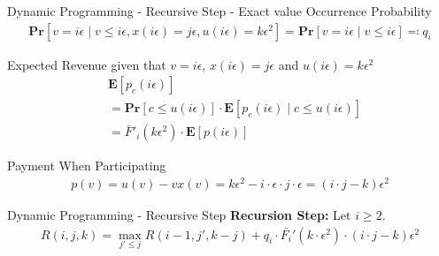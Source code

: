 \documentclass{beamer}
\begin{document}
\begin{frame}{Dynamic Programming - Recursive Step - Exact value}
  Occurrence Probability
  \begin{align*}
    \mathbf{Pr}[v = i\epsilon \mid v \leq i \epsilon, x(i\epsilon) = j\epsilon, u(i\epsilon) = k\epsilon^2] = \mathbf{Pr}[v = i\epsilon \mid v \leq i \epsilon] \eqcolon q_i
  \end{align*}

  Expected Revenue given that $v = i \epsilon$, $x(i\epsilon) = j\epsilon$ and $u(i\epsilon)=k\epsilon^2$
  \begin{align*}
     & \mathbf{E}\left[p_c(i \epsilon)\right]                                                                    \\
     & = \mathbf{Pr}[c \leq u(i \epsilon)] \cdot \mathbf{E}\left[p_c(i\epsilon) \mid c \leq u(i\epsilon) \right] \\
     & = \bar{F}'_i(k \epsilon^2) \cdot \mathbf{E}\left[p(i \epsilon)\right]
  \end{align*}

  Payment When Participating
  \begin{align*}
    p(v) = u(v) - v x(v) = k\epsilon^2 - i \cdot \epsilon \cdot j \cdot \epsilon = (i \cdot j - k) \epsilon^2
  \end{align*}
\end{frame}

\begin{frame}{Dynamic Programming - Recursive Step}
  \textbf{Recursion Step:}
  Let $i \geq 2$.
  \begin{align*}
    R(i,j,k) = \max_{j' \leq j} R(i-1, j', k-j) + q_i \cdot \bar{F_i}'(k \cdot \epsilon^2) \cdot (i\cdot j - k) \epsilon^2
  \end{align*}
\end{frame}
\end{document}
